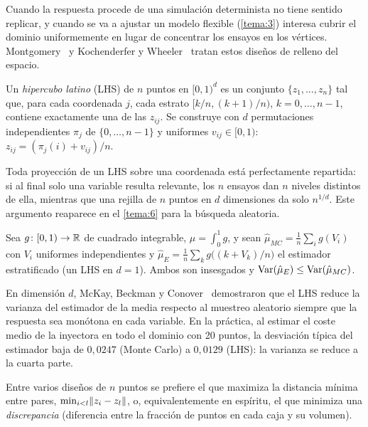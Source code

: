 Cuando la respuesta procede de una simulación determinista no tiene sentido replicar, y cuando se va a ajustar un modelo flexible (\cref{tema:3}) interesa cubrir el dominio uniformemente en lugar de concentrar los ensayos en los vértices. Montgomery~\cite[§11.5]{montgomery} y Kochenderfer y Wheeler~\cite[§13.3–13.5]{kw} tratan estos diseños de relleno del espacio.

\begin{definicion}\label{def:lhs}
Un \emph{hipercubo latino} (LHS) de $n$ puntos en $[0,1)^d$ es un conjunto $\{z_1,\dots,z_n\}$ tal que, para cada coordenada $j$, cada estrato $[k/n,(k+1)/n)$, $k=0,\dots,n-1$, contiene exactamente una de las $z_{ij}$. Se construye con $d$ permutaciones independientes $\pi_j$ de $\{0,\dots,n-1\}$ y uniformes $v_{ij}\in[0,1)$: $z_{ij}=(\pi_j(i)+v_{ij})/n$.
\end{definicion}

Toda proyección de un LHS sobre una coordenada está perfectamente repartida: si al final solo una variable resulta relevante, los $n$ ensayos dan $n$ niveles distintos de ella, mientras que una rejilla de $n$ puntos en $d$ dimensiones da solo $n^{1/d}$. Este argumento reaparece en el \cref{tema:6} para la búsqueda aleatoria.

\begin{teorema}\label{teo:estratificado}
Sea $g\colon[0,1)\to\mathbb{R}$ de cuadrado integrable, $\mu=\int_0^1g$, y sean $\hat\mu_{MC}=\frac1n\sum_ig(V_i)$ con $V_i$ uniformes independientes y $\hat\mu_{E}=\frac1n\sum_{k}g\bigl((k+V_k)/n\bigr)$ el estimador estratificado (un LHS en $d=1$). Ambos son insesgados y $\operatorname{Var}(\hat\mu_E)\le\operatorname{Var}(\hat\mu_{MC})$.
\end{teorema}

En dimensión $d$, McKay, Beckman y Conover~\cite[§2.1]{mckay} demostraron que el LHS reduce la varianza del estimador de la media respecto al muestreo aleatorio siempre que la respuesta sea monótona en cada variable. En la práctica, al estimar el coste medio de la inyectora en todo el dominio con 20 puntos, la desviación típica del estimador baja de $0{,}0247$ (Monte Carlo) a $0{,}0129$ (LHS): la varianza se reduce a la cuarta parte.

\begin{definicion}\label{def:maximin}
Entre varios diseños de $n$ puntos se prefiere el que maximiza la distancia mínima entre pares, $\min_{i<l}\lVert z_i-z_l\rVert$, o, equivalentemente en espíritu, el que minimiza una \emph{discrepancia} (diferencia entre la fracción de puntos en cada caja y su volumen).
\end{definicion}

